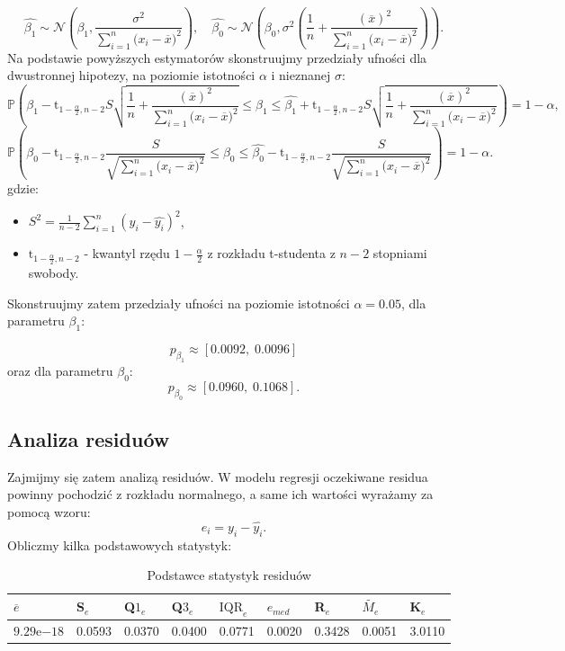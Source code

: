 \documentclass[fleqn]{article}
\begin{document}
    $$
        \hat{\beta_{1}} \sim \mathcal{N}\left( \beta_{1}, \frac{\sigma^2}{\sum_{i = 1}^{n}{(x_i-\overline{x}})^2} \right), \quad 
        \hat{\beta_{0}} \sim \mathcal{N}\left( \beta_{0}, \sigma^2 \left( \frac{1}{n} + \frac{(\overline{x})^2}{\sum_{i = 1}^{n}{(x_i-\overline{x}})^2} \right) \right). 
    $$%
    Na podstawie powyższych estymatorów skonstruujmy przedziały ufności dla dwustronnej hipotezy, na poziomie istotności $\alpha$ i nieznanej $\sigma$:
    $$
        \mathds{P}\left(\hat{\beta_{1}} - \text{t}_{1-\frac{\alpha}{2},n-2}S\sqrt{\frac{1}{n} + \frac{(\overline{x})^2}{\sum_{i = 1}^{n}{(x_i-\overline{x}})^2}}
        \le \beta_{1} 
        \le\hat{\beta_{1}} + \text{t}_{1-\frac{\alpha}{2},n-2}S\sqrt{\frac{1}{n} + \frac{(\overline{x})^2}{\sum_{i = 1}^{n}{(x_i-\overline{x}})^2} }   \right) = 1-\alpha,
    $$%
    $$
        \mathds{P}\left(\hat{\beta_{0}} - \text{t}_{1-\frac{\alpha}{2},n-2}\frac{S}{\sqrt{\sum_{i = 1}^{n}{(x_i-\overline{x}})^2}}
        \le \beta_{0} \le
        \hat{\beta_{0}} - \text{t}_{1-\frac{\alpha}{2},n-2}\frac{S}{\sqrt{\sum_{i = 1}^{n}{(x_i-\overline{x}})^2}}       
        \right) = 1-\alpha.
    $$%
    gdzie:
    \begin{itemize}
        \item[] $S^2 = \frac{1}{n-2}\sum_{i=1}^n(y_i-\hat{y_i})^2$,
        \item[] $\text{t}_{1-\frac{\alpha}{2},n-2}$ - kwantyl rzędu $1-\frac{\alpha}{2}$ z rozkładu t-studenta z $n-2$ stopniami swobody.    
    \end{itemize}

    \noindent Skonstruujmy zatem przedziały ufności na poziomie istotności $\alpha = 0.05$, dla parametru $\beta_{1}$:
    
    $$
    p_{\beta_{1}} \approx [0.0092,\; 0.0096]
    $$
    oraz dla parametru $\beta_{0}$:
    $$
    p_{\beta_{0}} \approx [0.0960,\; 0.1068].
    $$

    \subsection{Analiza residuów}
    Zajmijmy się zatem analizą residuów. W modelu regresji oczekiwane residua powinny pochodzić z rozkładu normalnego, a same ich wartości wyrażamy za pomocą wzoru:
    $$
        e_i = y_i  - \hat{y_i}.
    $$
    Obliczmy kilka podstawowych statystyk:
    \begin{table}[H]
    	\centering
    	\begin{tabular}{|l|l|l|l|l|l|l|l|l|}
    		\hline
    		$\overline{e}$  &  S${_e}$& Q$1_e $ &Q$3_e$ & $\text{IQR}_e$&  $e_{med} $& R$_e$  & \multirow{1.4}{1em}{$\widetilde{M_e}$} & K$_e$ \\[0.25em] \hline
    		$ 9.29\mathrm{e}{-18}$& 0.0593 & 0.0370 &  0.0400   &  0.0771& 0.0020  & 0.3428 &0.0051 & 3.0110\\ \hline
    	\end{tabular}
    	\caption{Podstawce statystyk residuów}
    	\label{tab:1}
    \end{table}
\end{document}
